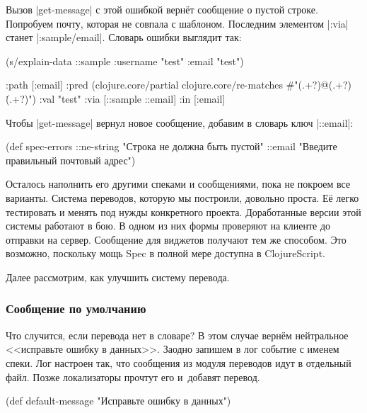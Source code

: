 Вызов \spverb|get-message| с этой ошибкой верн\"{е}т сообщение о пустой
строке. Попробуем почту, которая не совпала с шаблоном. Последним элементом
\spverb|:via| станет \spverb|:sample/email|. Словарь ошибки выглядит так:

\begin{english}
  \begin{clojure}
(s/explain-data ::sample {:username "test" :email "test"})

{:path [:email]
 :pred
 (clojure.core/partial
  clojure.core/re-matches
  #"(.+?)@(.+?)\.(.+?)")
 :val "test"
 :via [::sample ::email]
 :in [:email]}
  \end{clojure}
\end{english}

Чтобы \spverb|get-message| вернул новое сообщение, добавим в словарь ключ
\spverb|::email|:

  \begin{clojure}
(def spec-errors
  {::ne-string "Строка не должна быть пустой"
   ::email "Введите правильный почтовый адрес"})
  \end{clojure}


Осталось наполнить его другими спеками и сообщениями, пока не покроем все
варианты. Система переводов, которую мы построили, довольно проста. Е\"{е} легко
тестировать и менять под нужды конкретного проекта. Доработанные версии этой
системы работают в бою. В одном из них формы проверяют на клиенте до отправки на
сервер. Сообщение для виджетов получают тем же способом. Это возможно, поскольку
мощь Spec в полной мере доступна в ClojureScript.

Далее рассмотрим, как улучшить систему перевода.

\subsubsection{Сообщение по умолчанию}

Что случится, если перевода нет в словаре? В этом случае верн\"{е}м нейтральное
<<исправьте ошибку в данных>>. Заодно запишем в лог событие с именем спеки. Лог
настроен так, что сообщения из модуля переводов идут в отдельный файл. Позже
локализаторы прочтут его и~добавят перевод.

  \begin{clojure}
(def default-message
  "Исправьте ошибку в данных")
  \end{clojure}

